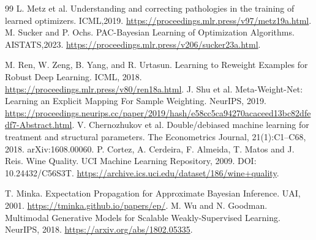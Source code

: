 \documentclass[10pt]{article}
\begin{document}
\begin{thebibliography}{99}
 L. Metz et al. Understanding and correcting pathologies in the training of learned optimizers. ICML,2019. \url{https://proceedings.mlr.press/v97/metz19a.html}.
 M. Sucker and P. Ochs. PAC-Bayesian Learning of Optimization Algorithms. AISTATS,2023. \url{https://proceedings.mlr.press/v206/sucker23a.html}.

 M. Ren, W. Zeng, B. Yang, and R. Urtasun. Learning to Reweight Examples for Robust Deep Learning. ICML, 2018. \url{https://proceedings.mlr.press/v80/ren18a.html}.
 J. Shu et al. Meta-Weight-Net: Learning an Explicit Mapping For Sample Weighting. NeurIPS, 2019. \url{https://proceedings.neurips.cc/paper/2019/hash/e58cc5ca94270acaceed13bc82dfedf7-Abstract.html}.
 V. Chernozhukov et al. Double/debiased machine learning for treatment and structural parameters. The Econometrics Journal, 21(1):C1--C68, 2018. arXiv:1608.00060.
 P. Cortez, A. Cerdeira, F. Almeida, T. Matos and J. Reis. Wine Quality. UCI Machine Learning Repository, 2009. DOI: 10.24432/C56S3T. \url{https://archive.ics.uci.edu/dataset/186/wine+quality}.

 T. Minka. Expectation Propagation for Approximate Bayesian Inference. UAI, 2001. \url{https://tminka.github.io/papers/ep/}.
 M. Wu and N. Goodman. Multimodal Generative Models for Scalable Weakly-Supervised Learning. NeurIPS, 2018. \url{https://arxiv.org/abs/1802.05335}.
\end{thebibliography}
\end{document}
